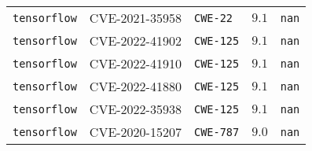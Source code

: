 \begin{table}
\begin{tabular}{lllll}
\texttt{tensorflow} & CVE-2021-35958 & \texttt{CWE-22} & $9.1$ & \texttt{nan} \\
\texttt{tensorflow} & CVE-2022-41902 & \texttt{CWE-125} & $9.1$ & \texttt{nan} \\
\texttt{tensorflow} & CVE-2022-41910 & \texttt{CWE-125} & $9.1$ & \texttt{nan} \\
\texttt{tensorflow} & CVE-2022-41880 & \texttt{CWE-125} & $9.1$ & \texttt{nan} \\
\texttt{tensorflow} & CVE-2022-35938 & \texttt{CWE-125} & $9.1$ & \texttt{nan} \\
\texttt{tensorflow} & CVE-2020-15207 & \texttt{CWE-787} & $9.0$ & \texttt{nan} \\
\bottomrule
\end{tabular}
\end{table}
